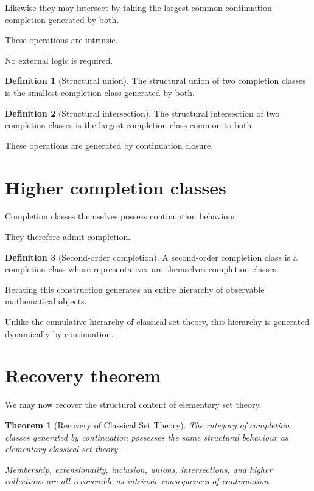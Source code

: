 \documentclass[13pt,openany]{book}
\theoremstyle{plain}
\newtheorem{theorem}{Theorem}[chapter]
\theoremstyle{definition}
\newtheorem{definition}{Definition}[chapter]
\begin{document}
Likewise they may intersect by taking the largest common continuation
completion generated by both.

These operations are intrinsic.

No external logic is required.

\begin{definition}[Structural union]
The structural union of two completion classes is the smallest completion
class generated by both.
\end{definition}

\begin{definition}[Structural intersection]
The structural intersection of two completion classes is the largest
completion class common to both.
\end{definition}

These operations are generated by continuation closure.


\section{Higher completion classes}

Completion classes themselves possess continuation behaviour.

They therefore admit completion.

\begin{definition}[Second-order completion]
A second-order completion class is a completion class whose representatives
are themselves completion classes.
\end{definition}

Iterating this construction generates an entire hierarchy of observable
mathematical objects.

Unlike the cumulative hierarchy of classical set theory, this hierarchy is
generated dynamically by continuation.


\section{Recovery theorem}

We may now recover the structural content of elementary set theory.

\begin{theorem}[Recovery of Classical Set Theory]
The category of completion classes generated by continuation possesses the
same structural behaviour as elementary classical set theory.

Membership, extensionality, inclusion, unions, intersections, and higher
collections are all recoverable as intrinsic consequences of continuation.
\end{theorem}
\end{document}
